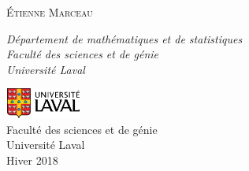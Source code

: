 \begin{titlepage}
	\vspace{0.5\baselineskip} %
	
	{\scshape\Large Étienne Marceau \\} %
	
	\vspace{0.5\baselineskip} %
	
	\textit{Département de mathématiques et de statistiques\\Faculté des sciences et de génie\\Université Laval} %
	
	\vfill %
	
	
        
        \includegraphics[height=1cm, width=2.5cm]{UL_P.pdf}\\
        Faculté des sciences et de génie\\
        Université Laval\\
        Hiver 2018       
\end{titlepage}

